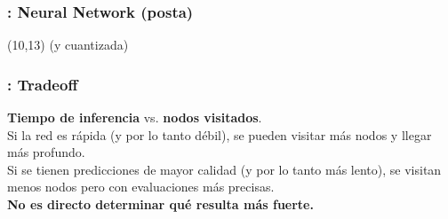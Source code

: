 \begin{frame}
\frametitle{: \textbf{N}eural \textbf{N}etwork (posta)}
\begin{figure}[H]
\centering
{}
\end{figure}
\begin{textblock}{5}(10,13)
(y cuantizada)
\end{textblock}
\end{frame}

%

\begin{frame}
\frametitle{: Tradeoff}
\textbf{Tiempo de inferencia} vs. \textbf{nodos visitados}. \\
\vspace{1em}
\pause
Si la red es rápida (y por lo tanto débil), se pueden visitar más nodos y llegar más profundo. \\
\pause
Si se tienen predicciones de mayor calidad (y por lo tanto más lento), se visitan menos nodos pero con evaluaciones más precisas. \\
\pause
\vspace{1em}
\textbf{No es directo determinar qué resulta más fuerte.}
\end{frame}
